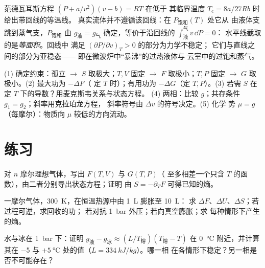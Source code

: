 \begin{remark}[范德瓦耳斯方程与麦克斯韦作图法]\label{rem:b2:thermodynamic-potentials:maxwellconstruction}
范德瓦耳斯方程 $(P + a/v^2)(v - b) = RT$ 在低于
其临界温度 $T_{\text{c}} = 8a/27Rb$ 时给出带回线的等温线。
真实流体并不遵循该回线：在 $P_{\text{饱和}}(T)$ 处它从
由液体支跳到蒸气支，$P_{\text{饱和}}$ 由 $g_{\text{液}}
= g_{\text{气}}$ 确定，等价于沿回线的 $\int_{\text{液}}^{\text{气}}v\,\dd P = 0$：
水平线截取的是\emph{等面积}。回线中
满足 $(\partial P/\partial v)_T > 0$ 的部分为力学不稳定；
它们与直线之间的部分为亚稳态——
即在微波炉中“暴沸”的过热液体与
云室中的过饱和蒸气。
\end{remark}

\begin{method}[使用热力学势]\label{meth:b2:thermodynamic-potentials:method}
(1) 确定约束：孤立 $\to$ $S$ 取极大；$T,V$ 固定 $\to$
$F$ 取极小；$T,P$ 固定 $\to$ $G$ 取极小。(2) 最大功为 $-\Delta F$（
定 $T$ 时）；有用功为 $-\Delta G$（定 $T,P$）。(3) 若需 $S$ 在
定 $T$ 下的导数？用麦克斯韦关系与状态方程。
(4) 两相：比较 $g$；共存条件 $g_1 = g_2$；斜率用克拉珀龙方程，
斜率符号由 $\Delta v$ 的符号决定。(5) 化学
势 $\mu = g$（每摩尔）：物质向 $\mu$ 较低的方向流动。
\end{method}

\section{练习}

\begin{exercise}[$\star$]\label{exo:b2:thermodynamic-potentials:1}
对 $n$ 摩尔理想气体，写出 $F(T,V)$ 与 $G(T,P)$（
至多相差一个只含 $T$ 的函数），由二者分别导出状态方程；证明
由 $S = -\partial_TF$ 可得已知的熵。
\end{exercise}

\begin{exercise}[$\star$]\label{exo:b2:thermodynamic-potentials:2}
一摩尔气体，\qty{300}{K}，在恒温热源中由 \qty{1}{L} 膨胀至 \qty{10}{L}：
求 $\Delta F$、$\Delta U$、$\Delta S$；若过程可逆，求回收的功；
若对抗 \qty{1}{bar} 外压；若向真空膨胀；求
每种情形下产生的熵。
\end{exercise}

\begin{exercise}[$\star$]\label{exo:b2:thermodynamic-potentials:3}
水与冰在 \qty{1}{bar} 下：证明 $g_{\text{液}} - g_{\text{冰}} \approx
(L/T_{\text{熔}})(T_{\text{熔}} - T)$ 在 \qty{0}{\celsius} 附近，并计算
其在 \qty{-5}{} 与 $+\qty{5}{\celsius}$ 处的值（$L = \qty{334}{kJ/kg}$）。哪一相
在各情形下稳定？另一相是否不可能存在？
\end{exercise}

